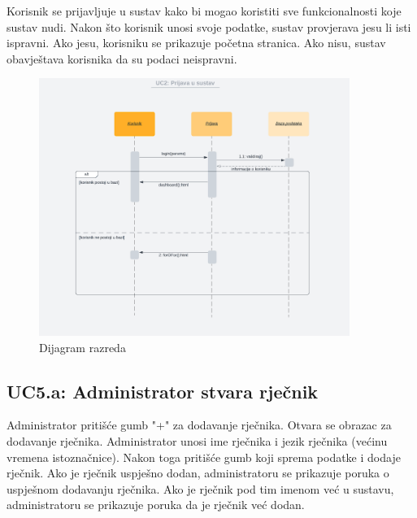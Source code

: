 					Korisnik se prijavljuje u sustav kako bi mogao koristiti sve funkcionalnosti koje sustav nudi. Nakon što korisnik unosi svoje podatke, sustav provjerava jesu li isti ispravni. Ako jesu, korisniku se prikazuje početna stranica. Ako nisu, sustav obavještava korisnika da su podaci neispravni.\\
					
				\begin{figure}[H]
					\includegraphics[width=0.9\textwidth]{dijagrami/UC2.png} 
					\centering
					\caption{Dijagram razreda}
					\label{fig:class_diagram}
				\end{figure}	
				\eject

				\subsection*{UC5.a: Administrator stvara rječnik}

				Administrator pritišće gumb "+" za dodavanje rječnika. Otvara se obrazac za dodavanje rječnika. Administrator unosi ime rječnika i jezik rječnika (većinu vremena istoznačnice). Nakon toga pritišće gumb koji sprema podatke i dodaje rječnik. Ako je rječnik uspješno dodan, administratoru se prikazuje poruka o uspješnom dodavanju rječnika. Ako je rječnik pod tim imenom već u sustavu, administratoru se prikazuje poruka da je rječnik već dodan.\\

